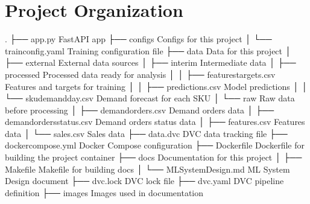 \documentclass[letterpaper,10pt,english]{sphinxmanual}
\begin{document}
\section{Project Organization}
\label{\detokenize{index:project-organization}}
\begin{sphinxVerbatim}[commandchars=\\\{\}]
.
├── app.py                \PYGZlt{}\PYGZhy{}\PYGZhy{}\PYGZhy{} FastAPI app
├── configs               \PYGZlt{}\PYGZhy{}\PYGZhy{}\PYGZhy{} Configs for this project
│   └── train\PYGZus{}config.yaml     \PYGZlt{}\PYGZhy{}\PYGZhy{}\PYGZhy{} Training configuration file
├── data                  \PYGZlt{}\PYGZhy{}\PYGZhy{}\PYGZhy{} Data for this project
│   ├── external              \PYGZlt{}\PYGZhy{}\PYGZhy{}\PYGZhy{} External data sources
│   ├── interim               \PYGZlt{}\PYGZhy{}\PYGZhy{}\PYGZhy{} Intermediate data
│   ├── processed             \PYGZlt{}\PYGZhy{}\PYGZhy{}\PYGZhy{} Processed data ready for analysis
│   │   ├── features\PYGZus{}targets.csv  \PYGZlt{}\PYGZhy{}\PYGZhy{}\PYGZhy{} Features and targets for training
│   │   ├── predictions.csv     \PYGZlt{}\PYGZhy{}\PYGZhy{}\PYGZhy{} Model predictions
│   │   └── sku\PYGZus{}demand\PYGZus{}day.csv  \PYGZlt{}\PYGZhy{}\PYGZhy{}\PYGZhy{} Demand forecast for each SKU
│   └── raw                   \PYGZlt{}\PYGZhy{}\PYGZhy{}\PYGZhy{} Raw data before processing
│       ├── demand\PYGZus{}orders.csv  \PYGZlt{}\PYGZhy{}\PYGZhy{}\PYGZhy{} Demand orders data
│       ├── demand\PYGZus{}orders\PYGZus{}status.csv  \PYGZlt{}\PYGZhy{}\PYGZhy{}\PYGZhy{} Demand orders status data
│       ├── features.csv     \PYGZlt{}\PYGZhy{}\PYGZhy{}\PYGZhy{} Features data
│       └── sales.csv       \PYGZlt{}\PYGZhy{}\PYGZhy{}\PYGZhy{} Sales data
├── data.dvc               \PYGZlt{}\PYGZhy{}\PYGZhy{}\PYGZhy{} DVC data tracking file
├── docker\PYGZhy{}compose.yml     \PYGZlt{}\PYGZhy{}\PYGZhy{}\PYGZhy{} Docker Compose configuration
├── Dockerfile             \PYGZlt{}\PYGZhy{}\PYGZhy{}\PYGZhy{} Dockerfile for building the project container
├── docs                   \PYGZlt{}\PYGZhy{}\PYGZhy{}\PYGZhy{} Documentation for this project
│   ├── Makefile               \PYGZlt{}\PYGZhy{}\PYGZhy{}\PYGZhy{} Makefile for building docs
│   └── ML\PYGZus{}System\PYGZus{}Design.md    \PYGZlt{}\PYGZhy{}\PYGZhy{}\PYGZhy{} ML System Design document
├── dvc.lock               \PYGZlt{}\PYGZhy{}\PYGZhy{}\PYGZhy{} DVC lock file
├── dvc.yaml               \PYGZlt{}\PYGZhy{}\PYGZhy{}\PYGZhy{} DVC pipeline definition
├── images                 \PYGZlt{}\PYGZhy{}\PYGZhy{}\PYGZhy{} Images used in documentation

\end{sphinxVerbatim}
\end{document}

